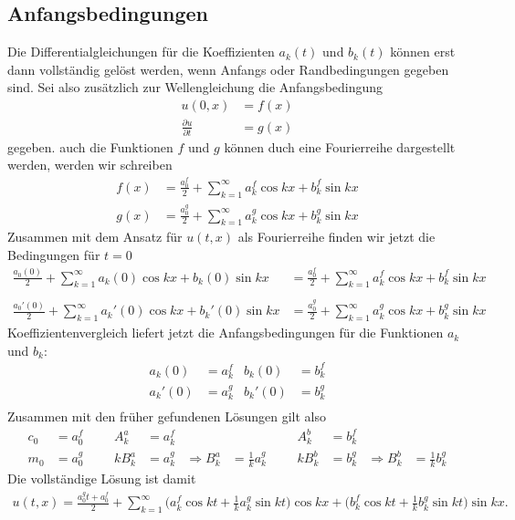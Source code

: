 \subsection{Anfangsbedingungen}
Die Differentialgleichungen für die Koeffizienten $a_k(t)$ und $b_k(t)$
können erst dann vollständig gelöst werden, wenn Anfangs oder Randbedingungen
gegeben sind. Sei also zusätzlich zur Wellengleichung die Anfangsbedingung
\begin{align*}
u(0,x)&=f(x)\\
\frac{\partial u}{\partial t}&=g(x)
\end{align*}
gegeben. auch die Funktionen $f$ und $g$ können duch eine Fourierreihe
dargestellt werden, werden wir schreiben
\begin{align*}
f(x)&=\frac{a_0^f}2+\sum_{k=1}^\infty a_k^f\cos kx+b_k^f\sin kx\\
g(x)&=\frac{a_0^g}2+\sum_{k=1}^\infty a_k^g\cos kx+b_k^g\sin kx
\end{align*}
Zusammen mit dem Ansatz für $u(t,x)$ als Fourierreihe finden wir jetzt
die Bedingungen für $t=0$
\begin{align*}
\frac{a_0(0)}2+\sum_{k=1}^\infty a_k(0)\cos kx +b_k(0)\sin kx
&=
\frac{a_0^f}2+\sum_{k=1}^\infty a_k^f\cos kx+b_k^f\sin kx\\
\\
\frac{a_0'(0)}2+\sum_{k=1}^\infty a_k'(0)\cos kx+b_k'(0)\sin kx
&=
\frac{a_0^g}2+\sum_{k=1}^\infty a_k^g\cos kx+b_k^g\sin kx
\end{align*}
Koeffizientenvergleich liefert jetzt die Anfangsbedingungen für die
Funktionen $a_k$ und $b_k$:
\begin{align*}
a_k(0)&=a_k^f&b_k(0)&=b_k^f\\
a_k'(0)&=a_k^g&b_k'(0)&=b_k^g\\
\end{align*}
Zusammen mit den früher gefundenen Lösungen gilt also
\begin{align*}
c_0&=a_0^f&&&A_k^a&=a_k^f&&&&&A_k^b&=b_k^f\\
m_0&=a_0^g&&&kB_k^a&=a_k^g&\Rightarrow B_k^a&=\frac1ka_k^g&&&kB_k^b&=b_k^g&\Rightarrow B_k^b&=\frac1kb_k^g
\end{align*}
Die vollständige Lösung ist damit
\begin{align*}
u(t,x)=\frac{a_0^gt+a_0^f}2
+\sum_{k=1}^\infty
\biggl(a_k^f\cos kt+\frac1ka_k^g\sin kt\biggr)\cos kx
+
\biggl(b_k^f\cos kt+\frac1kb_k^g\sin kt\biggr)\sin kx.
\end{align*}

